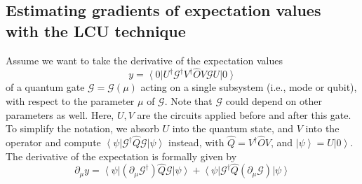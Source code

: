 \documentclass[aps,pra,10pt,twocolumn,groupedaddress,nofootinbib]{revtex4-1}
\theoremstyle{plain}
\newcommand{\ket}[1]{\ensuremath{\left| #1 \right \rangle}}
\newcommand{\bra}[1]{\ensuremath{\left \langle #1 \right |}}
\newcommand{\G}{\mathcal{G}}
\begin{document}
\subsection{Estimating gradients of expectation values with the LCU technique}

Assume we want to take the derivative of the expectation values
\[ y = \bra{0}U^{\dagger} \G^{\dagger}  V^{\dagger} \hat{O} V \G U \ket{0}\]
of a quantum gate $\G = \G(\mu)$ acting on a single subsystem (i.e., mode or qubit), with respect to the parameter $\mu$ of $\G$. Note that $\G$ could depend on other parameters as well. Here, $U,V$ are the circuits applied before and after this gate. To simplify the notation, we absorb $U$ into the quantum state, and $V$ into the operator and compute $ \bra{\psi} \G^{\dagger}  \hat{Q} \G \ket{\psi}$ instead, with $\hat{Q} = V^{\dagger} \hat{O} V$, and $\ket{\psi}= U \ket{0}$.\\

The derivative of the expectation is formally given by
\begin{equation}
	\partial_{\mu} y = \bra{\psi} ( \partial_{\mu}\G^{\dagger})  \hat{Q} \G \ket{\psi} + \bra{\psi} \G^{\dagger}  \hat{Q}  (\partial_{\mu}\G) \ket{\psi}
	\label{Eq:der_of_exp}
\end{equation}
\end{document}
